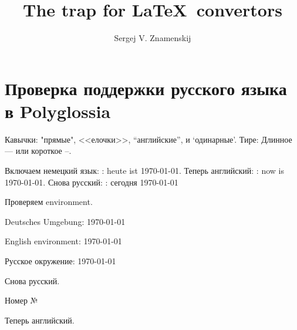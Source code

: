 \documentclass[12pt]{amsart}
\title{The trap for \LaTeX\ convertors}
\author{Sergej V. Znamenskij}
\begin{document}
\maketitle

\section{Проверка поддержки русского языка в Polyglossia}
Кавычки: "прямые", <<елочки>>, ``английские'', и
`одинарные'.
Тире: Длинное --- или короткое --.

Включаем немецкий язык: \textgerman{\seename{}: heute ist \today}.
Теперь английский: \textenglish{\seename{}: now is \today}.
Снова русский: \textrussian{\seename{}: сегодня \today}

Проверяем environment.

\begin{german}
Deutsches Umgebung:
\seename{} \today
\end{german}

\begin{english}
English environment:
\seename{} \today
\end{english}

\begin{russian}
Русское окружение:
\seename{} \today
\end{russian}

Снова русский.

Номер
№  \textnumero

Теперь английский.
\end{document}
